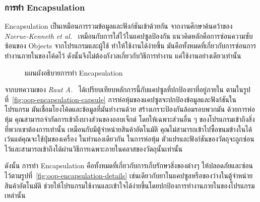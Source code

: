 \documentclass[12pt,one side,openright,a4paper]{cpe-thesis-th}
\newcommand{\thaijustify}[1]{%
  \par\hspace{30pt}\justifying
  #1
}
\begin{document}
        \subsubsection{การทำ Encapsulation}
            \thaijustify{
                Encapsulation เป็นเหมือนการรวมข้อมูลและฟังก์ชันเข้าด้วยกัน จากงานศึกษาค้นคว้าของ \textit{Nzerue-Kenneth et al.}~\cite{nzeruekenneth23polymorph} เหมือนกับการใส่ไว้ในแคปซูลป้องกัน แนวคิดหลักคือการซ่อนความซับซ้อนของ Objects จากโปรแกรมและผู้ใช้ ทำให้ใช้งานได้ง่ายขึ้น มันคือทั้งหมดที่เกี่ยวกับการซ่อนการทำงานภายในของโค้ดไว้ ดังนั้นจึงไม่ต้องกังวลเกี่ยวกับวิธีการทำงาน แค่ใช้งานอย่างเดียวเท่านั้น
            }
            \begin{figure}[H]
                \centering
                \caption[แผนผังอธิบายการทำ Encapsulation]{แผนผังอธิบายการทำ Encapsulation}
                \label{fig:oop-encapsulation}
            \end{figure}
            \thaijustify{
                จากบทความของ \textit{Raut A.}~\cite{raut22encapsule} ได้เปรียบเทียบหลักการนี้กับแคปซูลที่ปกป้องยาที่อยู่ภายใน ตามในรูปที่~\ref{fig:oop-encapsulation-capsule} การห่อหุ้มของแคปซูลจะปกป้องข้อมูลและฟังก์ชันในโปรแกรม มันเชื่อมโยงโค้ดและข้อมูลที่มันทำงานด้วย สร้างเกราะป้องกันล้อมรอบพวกมัน ด้วยการห่อหุ้ม คุณสามารถจำกัดการเข้าถึงบางส่วนของออบเจ็กต์ โดยให้เฉพาะส่วนอื่น ๆ ของโปรแกรมเข้าถึงสิ่งที่พวกเขาต้องการเท่านั้น เหมือนกับมีตู้จำหน่ายสินค้าอัตโนมัติ คุณไม่สามารถเข้าไปซื้อขนมข้างในได้เว้นแต่คุณจะใช้ปุ่มของเครื่อง ในทำนองเดียวกัน ในการห่อหุ้ม ตัวแปรและฟังก์ชันของวัตถุจะถูกซ่อนไว้และสามารถเข้าถึงได้ผ่านวิธีการเฉพาะภายในคลาสของวัตถุนั้นเท่านั้น
            }
            \thaijustify{
                ดังนั้น การทำ Encapsulation คือทั้งหมดที่เกี่ยวกับการเก็บรักษาสิ่งของต่างๆ ให้ปลอดภัยและซ่อนไว้ตามรูปที่~\ref{fig:oop-encapsulation-details} เช่นเดียวกับยาในแคปซูลหรือของว่างในตู้จำหน่ายสินค้าอัตโนมัติ ช่วยให้โปรแกรมใช้งานและเข้าใจได้ง่ายขึ้นโดยปกป้องการทำงานภายในของโปรแกรมเหล่านั้น~\cite{nishad22encapsulation}
            }
\end{document}
